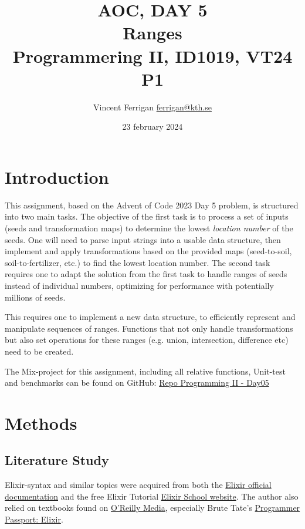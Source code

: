 \documentclass[a4paper,11pt]{article}
\begin{document}
\title{
    AOC, DAY 5
    \\Ranges
\\\small{Programmering II, ID1019, VT24 P1}
}
\author{Vincent Ferrigan \href{mailto:ferrigan@kth.se}{ferrigan@kth.se}}

\date{23 february 2024}
\maketitle

\section*{Introduction}
\label{sec:introduction}
This assignment, based on the Advent of Code 2023 Day 5 problem, is structured into two main tasks.
The objective of the first task is to process a set of inputs (seeds and transformation maps)
to determine the lowest \emph{location number} of the seeds.
One will need to parse input strings into a usable data structure,
then implement and apply transformations based on the provided maps
(seed-to-soil, soil-to-fertilizer, etc.) to find the lowest location number.
The second task requires one to
adapt the solution from the first task to handle ranges of seeds instead of individual numbers,
optimizing for performance with potentially millions of seeds.

This requires one to
implement a new data structure, to efficiently represent and manipulate sequences of ranges.
Functions that not only handle transformations but also set operations for these ranges
(e.g. union, intersection, difference etc) need to be created.

The Mix-project for this assignment, including all relative functions, Unit-test and benchmarks can be found on GitHub:
\href{https://github.com/VincentFerrigan/kth-id1019-programming-ii/tree/main/tasks/6/day05}{Repo Programming II - Day05}%

\section*{Methods}\label{sec:methods}
\subsection*{Literature Study}
\label{subsec:literaturestudy}
Elixir-syntax and similar topics were acquired
from both the
\href{https://elixir-lang.org/docs.html}{Elixir official documentation}
and the free Elixir Tutorial
\href{https://elixirschool.com/en}{Elixir School
website}.
The author also relied on textbooks found on
\href{https://learning.oreilly.com}{O'Reilly Media},
especially Brute Tate's
\href{https://learning.oreilly.com/library/view/programmer-passport-elixir/9781680509649/}{Programmer Passport: Elixir}.
\end{document}
